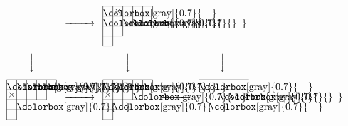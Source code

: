 \documentclass[ALCO,ThmDefs,Unicode,epreuves]{cedram}
\begin{document}
\begin{exam}
\begin{figure}[t]
$$\begin{CD}
{}
@>>>
\raisebox{-20pt}{
\begin{picture}(50,40)
\fboxsep=0mm
\put(0,30){\colorbox[gray]{0.7}{\makebox(10,10){}}}
\put(20,20){\colorbox[gray]{0.7}{\makebox(10,10){}}}
\put(30,20){\colorbox[gray]{0.7}{\makebox(10,10){}}}
\put(0,20){\colorbox[gray]{0.7}{\makebox(10,10){}}}
\put(0,40){\line(1,0){50}}
\put(0,30){\line(1,0){50}}
\put(0,20){\line(1,0){40}}
\put(0,10){\line(1,0){20}}
\put(0,0){\line(1,0){10}}
\put(0,0){\line(0,1){40}}
\put(10,0){\line(0,1){40}}
\put(20,10){\line(0,1){30}}
\put(30,20){\line(0,1){20}}
\put(40,20){\line(0,1){20}}
\put(50,30){\line(0,1){10}}
\put(10,30){\makebox(10,10){$\times$}}
\end{picture}
}
\\[5pt]
@VVV
@VVV
@VVV
\\[5pt]
\raisebox{-20pt}{
\begin{picture}(50,40)
\fboxsep=0mm
\put(0,30){\colorbox[gray]{0.7}{\makebox(10,10){}}}
\put(10,30){\colorbox[gray]{0.7}{\makebox(10,10){}}}
\put(20,30){\colorbox[gray]{0.7}{\makebox(10,10){}}}
\put(10,10){\colorbox[gray]{0.7}{\makebox(10,10){}}}
\put(0,40){\line(1,0){50}}
\put(0,30){\line(1,0){50}}
\put(0,20){\line(1,0){40}}
\put(0,10){\line(1,0){20}}
\put(0,0){\line(1,0){10}}
\put(0,0){\line(0,1){40}}
\put(10,0){\line(0,1){40}}
\put(20,10){\line(0,1){30}}
\put(30,20){\line(0,1){20}}
\put(40,20){\line(0,1){20}}
\put(50,30){\line(0,1){10}}
\put(0,20){\makebox(10,10){$\times$}}
\end{picture}
}
@>>>
\raisebox{-20pt}{
\begin{picture}(50,40)
\fboxsep=0mm
\put(0,30){\colorbox[gray]{0.7}{\makebox(10,10){}}}
\put(10,30){\colorbox[gray]{0.7}{\makebox(10,10){}}}
\put(30,20){\colorbox[gray]{0.7}{\makebox(10,10){}}}
\put(10,10){\colorbox[gray]{0.7}{\makebox(10,10){}}}
\put(0,40){\line(1,0){50}}
\put(0,30){\line(1,0){50}}
\put(0,20){\line(1,0){40}}
\put(0,10){\line(1,0){20}}
\put(0,0){\line(1,0){10}}
\put(0,0){\line(0,1){40}}
\put(10,0){\line(0,1){40}}
\put(20,10){\line(0,1){30}}
\put(30,20){\line(0,1){20}}
\put(40,20){\line(0,1){20}}
\put(50,30){\line(0,1){10}}
\put(0,20){\makebox(10,10){$\times$}}
\put(20,30){\makebox(10,10){$\times$}}
\end{picture}
}
@>>>
\raisebox{-20pt}{
\begin{picture}(50,40)
\fboxsep=0mm
\put(0,30){\colorbox[gray]{0.7}{\makebox(10,10){}}}
\put(20,20){\colorbox[gray]{0.7}{\makebox(10,10){}}}
\put(30,20){\colorbox[gray]{0.7}{\makebox(10,10){}}}
\put(10,10){\colorbox[gray]{0.7}{\makebox(10,10){}}}
\put(0,40){\line(1,0){50}}
\put(0,30){\line(1,0){50}}

\end{picture}}
\end{CD}$$
\end{figure}
\end{exam}
\end{document}
